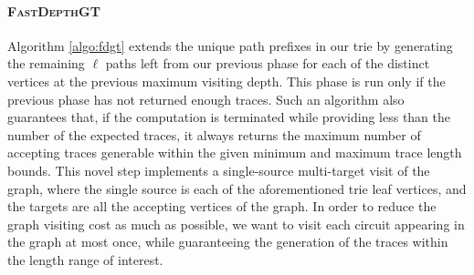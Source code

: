\documentclass[acmengage]{acmart}
\begin{document}









\paragraph*{\textsc{FastDepthGT}}    Algorithm \ref{algo:fdgt} extends the unique path prefixes in our trie by generating the remaining $\ell$ paths left from our previous phase for each of the distinct vertices at the previous maximum visiting depth.
This phase  is run only if the previous phase has not returned enough traces. Such an algorithm also guarantees that, if the computation is terminated while providing less than the number of the expected traces, it always returns the maximum number of accepting traces generable within the given minimum and maximum trace length bounds.
 This novel step implements a single-source multi-target visit of the graph, where the single source is each of the aforementioned trie leaf vertices, and the targets are all the accepting vertices of the graph. In order to reduce the graph visiting cost as much as possible, we want to visit each circuit appearing in the graph at most once, while guaranteeing the generation of the traces within the length range of interest. 
\end{document}
